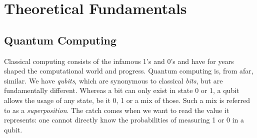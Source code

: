 \chapter{Theoretical Fundamentals} %

\label{chapter:theoretical_fundamentals} %

\def \blochwidth {0.3}
\def \histogramwidth {0.5}
\newcommand{\bloch}{\emph{Bloch}-Sphere}
\newcommand{\hgate}{$\mathrm{H}$-Gate}
\newcommand{\xgate}{$\mathrm{X}$-Gate}
\newcommand{\ygate}{$\mathrm{Y}$-Gate}
\newcommand{\zgate}{$\mathrm{Z}$-Gate}
\newcommand{\rygate}{$\mathrm{RY}$-Gate}
\newcommand{\rzgate}{$\mathrm{RZ}$-Gate}
\newcommand{\rxgate}{$\mathrm{RX}$-Gate}
\newcommand{\crygate}{$\mathrm{CRY}$-Gate}
\newcommand{\crzgate}{$\mathrm{CRZ}$-Gate}
\newcommand{\crxgate}{$\mathrm{CRX}$-Gate}
\newcommand{\frenchquotes}[1]{«~#1~»}

\section{Quantum Computing}
Classical computing consists of the infamous 1's and 0's and have for years shaped the computational world and progress. Quantum computing is, from afar, similar. We have \emph{qubits}, which are synonymous to classical \emph{bits}, but are fundamentally different. Whereas a bit can only exist in state 0 or 1, a qubit allows the usage of any state, be it 0, 1 or a mix of those. Such a mix is referred to as a \emph{superposition}\cite{gudder_superposition_1970}. The catch comes when we want to read the value it represents: one cannot directly know the probabilities of measuring 1 or 0 in a qubit.



